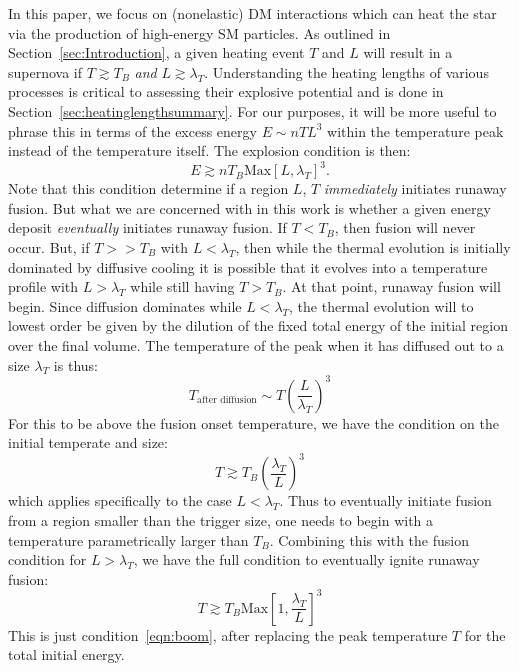 \documentclass[twocolumn,showpacs,preprintnumbers,amsmath,amssymb,prd]{revtex4}
\def\r{\right)}
\def\l{\left(}
\begin{document}
In this paper, we focus on (nonelastic) DM interactions which can heat the star via the production of high-energy SM particles. As outlined in Section~\ref{sec:Introduction}, a given heating event $T$ and $L$ will result in a supernova if $T \gtrsim T_B$ \emph{and} $L \gtrsim \lambda_T$. Understanding the heating lengths of various processes is critical to assessing their explosive potential and is done in Section~\ref{sec:heatinglengthsummary}.
For our purposes, it will be more useful to phrase this in terms of the excess energy $E \sim n T L^3$ within the temperature peak instead of the temperature itself. The explosion condition is then:
\begin{equation}
\label{eqn:boom}
E \gtrsim n T_B \text{Max}\left[L, \lambda_T\right]^3.
\end{equation}
Note that this condition determine if a region $L$, $T$ \emph{immediately} initiates runaway fusion.  But what we are concerned with in this work is whether a given energy deposit \emph{eventually} initiates runaway fusion.  If $T < T_B$, then fusion will never occur. But, if $T >> T_B$ with $L < \lambda_T$, then while the thermal evolution is initially dominated by diffusive cooling it is possible that it evolves into a temperature profile with $L > \lambda_T$ while still having $T > T_B$. At that point, runaway fusion will begin.  Since diffusion dominates while $L<\lambda_T$, the thermal evolution will to lowest order be given by the dilution of the fixed total energy of the initial region over the final volume.  The temperature of the peak when it has diffused out to a size $\lambda_T$ is thus:
\[
    T_{\text{after diffusion}} \sim T \l \frac{L}{\lambda_T} \r^3
\]
For this to be above the fusion onset temperature, we have the condition on the initial temperate and size:
\[
    T \gtrsim T_B \l \frac{\lambda_T}{L} \r^3
\]
which applies specifically to the case $L < \lambda_T$. Thus to eventually initiate fusion from a region smaller than the trigger size, one needs to begin with a temperature parametrically larger than $T_B$.  Combining this with the fusion condition for $L>\lambda_T$, we have the full condition to eventually ignite runaway fusion:
\[
    T \gtrsim T_B \text{Max}\left[1, \frac{\lambda_T}{L}\right]^3
\]
 This is just condition~\ref{eqn:boom}, after replacing the peak temperature $T$ for the total initial energy.
\end{document}
